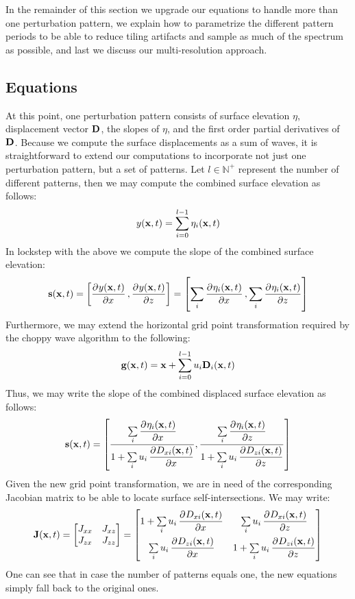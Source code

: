In the remainder of this section we upgrade our equations to handle more than
one perturbation pattern, we explain how to parametrize the different pattern
periods to be able to reduce tiling artifacts and sample as much of the spectrum
as possible, and last we discuss our multi-resolution approach.
%
\subsection{Equations}
At this point, one perturbation pattern consists of surface
elevation $\eta$, displacement vector $\mathbf{D}$, the slopes of $\eta$,
and the first order partial derivatives of $\mathbf{D}$.
Because we compute the surface
displacements as a sum of waves, it is straightforward to extend our
computations to incorporate not just one perturbation pattern, but a set of
patterns. Let $l \in \mathbb{N}^+$ represent the number of different patterns,
then we may compute the combined surface elevation as follows:
\begin{equation}
 y(\mathbf{x},t) = \sum\limits_{i=0}^{l-1}\eta_i(\mathbf{x},t)
\end{equation}
In lockstep with the above we compute the slope of the combined surface elevation:
\begin{equation}
 \mvec{s}(\mvec{x},t) = \left[\dpd{y(\mvec{x},t)}{x},\dpd{y(\mvec{x},t)}{z}\right]
 = \left[\sum\limits_i \dpd{\eta_i(\mvec{x},t)}{x}, \sum\limits_i \dpd{\eta_i(\mvec{x},t)}{z}\right]
\end{equation}
Furthermore, we may extend the horizontal grid point transformation required by
the choppy wave algorithm to the following:
\begin{equation}
\mathbf{g}(\mathbf{x},t) = \mathbf{x}+\sum\limits_{i=0}^{l-1}u_i\mathbf{D}_i(\mathbf{x},t) 
\end{equation}
Thus, we may write the slope of the combined displaced surface elevation as follows:
\begin{equation}
\mvec{s}(\mvec{x},t) = \left[\frac{\sum\limits_i \dpd{\eta_i(\mvec{x},t)}{x}}{1 
+ \sum\limits_i u_i \dpd{D_{xi}(\mvec{x},t)}{x}}, \frac{\sum\limits_i 
\dpd{\eta_i(\mvec{x},t)}{z}}{1 + \sum\limits_i 
u_i\dpd{D_{zi}(\mvec{x},t)}{z}}\right]
\end{equation}
Given the new grid point transformation, we are in need of the corresponding
Jacobian matrix to be able to locate surface self-intersections. We may write:
\begin{equation}
\label{eq:jacobian_of_displacement_multi}
 \mvec{J}(\mvec{x},t) =
 \begin{bmatrix}
 J_{xx} & J_{xz} \\
 J_{zx} & J_{zz}
 \end{bmatrix}
 =
 \begin{bmatrix}
   1 + \sum\limits_i u_i\dpd{D_{xi}(\mvec{x},t)}{x} & \sum\limits_i u_i\dpd{D_{xi}(\mvec{x},t)}{z} \\[1em]
   \sum\limits_i u_i\dpd{D_{zi}(\mvec{x},t)}{x} & 1 + \sum\limits_i u_i\dpd{D_{zi}(\mvec{x},t)}{z}
 \end{bmatrix}
\end{equation}
%
One can see that in case the number of patterns equals one, the new equations
simply fall back to the original ones.
%
